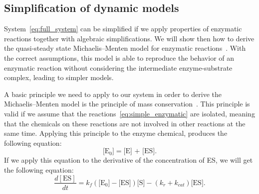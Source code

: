 \subsection{Simplification of dynamic models}
System~\ref{eq:full_system} can be simplified if we
apply properties of enzymatic reactions together with algebraic 
simplifications. We will show then how to derive the quasi-steady state 
Michaelis--Menten model for enzymatic reactions~\cite{Michaelis}. With 
the correct assumptions, this model is able to reproduce the behavior of
an enzymatic reaction without considering the intermediate 
enzyme-substrate complex, leading to simpler models.

A basic principle we need to apply to our system in order to derive
the Michaelis--Menten model is the principle of mass
conservation~\cite{lomonosov1970mikhail}. This principle is valid if we
assume that the reactions~\ref{eq:simple_enzymatic} are isolated,
meaning that the  chemicals on these reactions are not involved in other
reactions at the same time. Applying this principle to the enzyme
chemical, produces the following equation:
\begin{equation}
    \text{[E$_0$]} = \text{[E] + [ES]}.
    \label{eq:E_conservation}
\end{equation}
If we apply this equation to the derivative of the concentration of ES,
we will get the following equation:
\begin{equation}
    \frac{d[\text{ES}]}{dt} =  
        k_f(\text{[E$_0$]} - \text{[ES]})\text{[S]} 
        - (k_r + k_{cat}) \text{[ES]}. 
        \label{eq:dESdt_2}
\end{equation}

